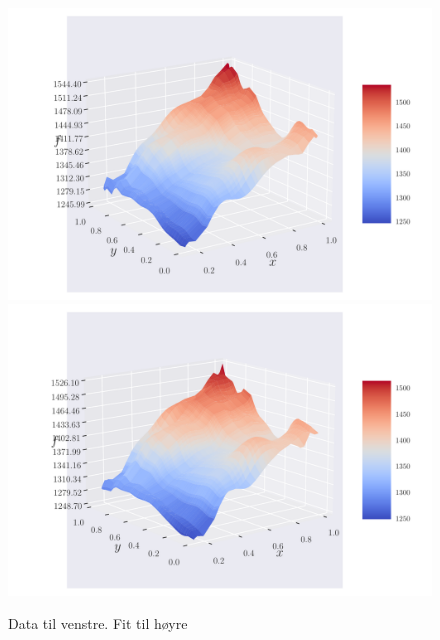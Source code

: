 \documentclass[reprint,english,notitlepage,aps,nobalancelastpage,nofootinbib]{revtex4-1}  %
\begin{document}
\begin{figure}[H]
	\includegraphics[width=\linewidth]{SRTM_prediction_p30.pdf}
	\endminipage\hfill
	\includegraphics[width=\linewidth]{SRTM_prediction_p50.pdf}
	\endminipage
	\caption{Data til venstre. Fit til høyre}
  \label{fig:terrain_fit}
\end{figure}
\end{document}
